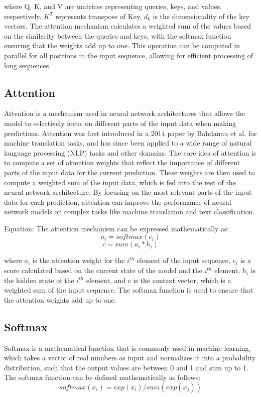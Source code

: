 \documentclass[12pt]{report}
\begin{document}
where Q, K, and V are matrices representing queries, keys, and values, respectively. {$K^T$} represents transpose of Key, {$d_{k}$} is the dimensionality of the key vectors. The attention mechanism calculates a weighted sum of the values based on the similarity between the queries and keys, with the softmax function ensuring that the weights add up to one. This operation can be computed in parallel for all positions in the input sequence, allowing for efficient processing of long sequences.

 \subsection{Attention}
Attention is a mechanism used in neural network architectures that allows the model to selectively focus on different parts of the input data when making predictions. Attention was first introduced in a 2014 paper by Bahdanau et al. for machine translation tasks, and has since been applied to a wide range of natural language processing (NLP) tasks and other domains. The core idea of attention is to compute a set of attention weights that reflect the importance of different parts of the input data for the current prediction. These weights are then used to compute a weighted sum of the input data, which is fed into the rest of the neural network architecture. By focusing on the most relevant parts of the input data for each prediction, attention can improve the performance of neural network models on complex tasks like machine translation and text classification.

Equation: The attention mechanism can be expressed mathematically as:
\begin{equation}
    a_i = softmax(e_i)
\end{equation}
\begin{equation}
    c = sum(a_i * h_i)
\end{equation}

where {$a_i$} is the attention weight for the $i^{th}$ element of the input sequence, {$e_i$} is a score calculated based on the current state of the model and the $i^{th}$ element, {$h_i$} is the hidden state of the {$i^{th}$} element, and c is the context vector, which is a weighted sum of the input sequence. The softmax function is used to ensure that the attention weights add up to one.
 \subsection{Softmax}
Softmax is a mathematical function that is commonly used in machine learning, which takes a vector of real numbers as input and normalizes it into a probability distribution, such that the output values are between 0 and 1 and sum up to 1. The softmax function can be defined mathematically as follows:
\begin{equation}
    softmax(x_i) = exp(x_i) / sum(exp(x_j))
\end{equation}
\end{document}

